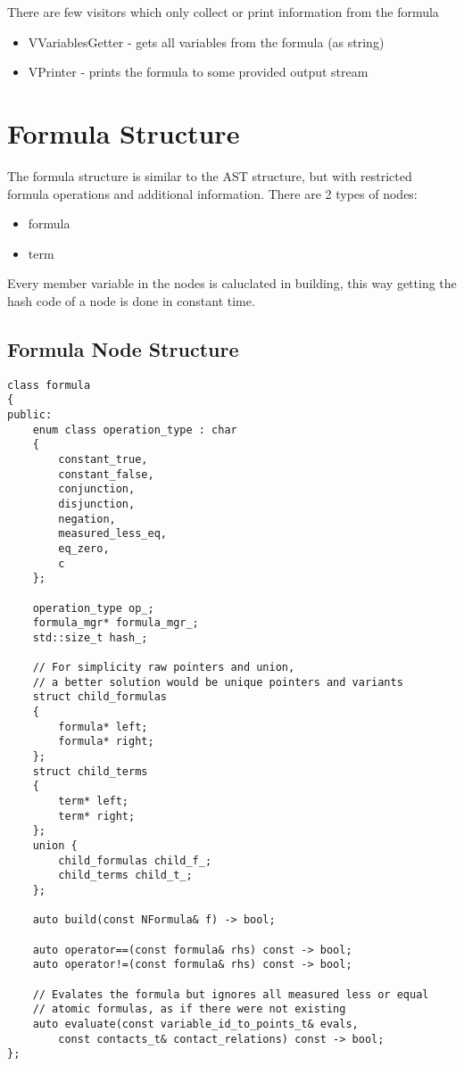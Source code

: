\documentclass{article}
\begin{document}
				There are few visitors which only collect or print information from the formula
					\begin{itemize}
						\item VVariablesGetter - gets all variables from the formula (as string)
						\item VPrinter - prints the formula to some provided output stream
					\end{itemize}

	\section{Formula Structure}
		The formula structure is similar to the AST structure, but with restricted formula operations and additional information.
		There are 2 types of nodes: 
			\begin{itemize}
				\item formula
				\item term
			\end{itemize}
		Every member variable in the nodes is caluclated in building, 
		this way getting the hash code of a node is done in constant time.

		\subsection*{Formula Node Structure}
		\begin{lstlisting}
class formula
{
public:
    enum class operation_type : char
    {
        constant_true,
        constant_false,
        conjunction,
        disjunction,
        negation,
        measured_less_eq,
        eq_zero,
        c
    };

    operation_type op_;
    formula_mgr* formula_mgr_;
    std::size_t hash_;

    // For simplicity raw pointers and union, 
    // a better solution would be unique pointers and variants
    struct child_formulas
    {
        formula* left;
        formula* right;
    };
    struct child_terms
    {
        term* left;
        term* right;
    };
    union {
        child_formulas child_f_;
        child_terms child_t_;
    };

    auto build(const NFormula& f) -> bool;

    auto operator==(const formula& rhs) const -> bool;
    auto operator!=(const formula& rhs) const -> bool;

    // Evalates the formula but ignores all measured less or equal 
    // atomic formulas, as if there were not existing
    auto evaluate(const variable_id_to_points_t& evals,
		const contacts_t& contact_relations) const -> bool;
};
		\end{lstlisting}
	
\end{document}
